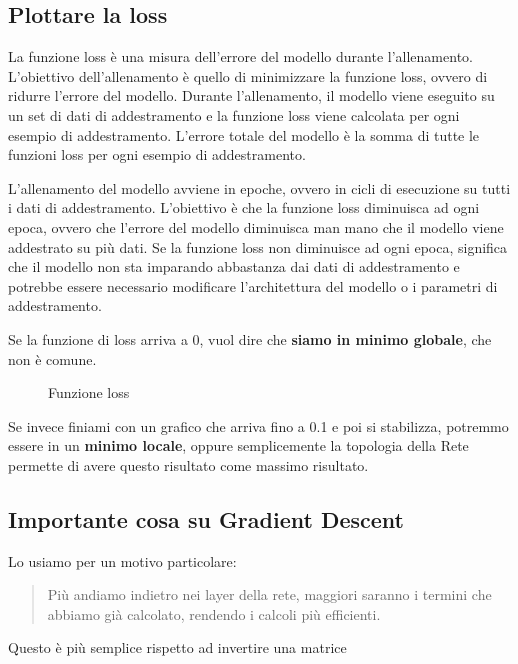 \subsection{Plottare la loss}

La funzione loss è una misura dell'errore del modello durante
l'allenamento. L'obiettivo dell'allenamento è quello di minimizzare la funzione
loss, ovvero di ridurre l'errore del modello. Durante l'allenamento, il modello
viene eseguito su un set di dati di addestramento e la funzione loss viene
calcolata per ogni esempio di addestramento. L'errore totale del modello è la
somma di tutte le funzioni loss per ogni esempio di addestramento.

L'allenamento del modello avviene in epoche, ovvero in cicli di esecuzione su
tutti i dati di addestramento. L'obiettivo è che la funzione loss diminuisca ad
ogni epoca, ovvero che l'errore del modello diminuisca man mano che il modello
viene addestrato su più dati. Se la funzione loss non diminuisce ad ogni epoca,
significa che il modello non sta imparando abbastanza dai dati di addestramento
e potrebbe essere necessario modificare l'architettura del modello o i
parametri di addestramento.

Se la funzione di loss arriva a 0, vuol dire che \textbf{siamo in minimo globale}, che non è comune.

\begin{figure}[H]
    \begin{center}
    \end{center}
    \caption{Funzione loss}
\end{figure}


Se invece finiami con un grafico che arriva fino a 0.1 e poi si stabilizza, 
potremmo essere in un \textbf{minimo locale}, oppure semplicemente la topologia della Rete
permette di avere questo risultato come massimo risultato.


\subsection{Importante cosa su Gradient Descent}

Lo usiamo per un motivo particolare:
\begin{quote}
    Più andiamo indietro nei layer della rete, maggiori saranno i termini 
    che abbiamo già calcolato, rendendo i calcoli più efficienti.
\end{quote}
Questo è più semplice rispetto ad invertire una matrice
\newpage